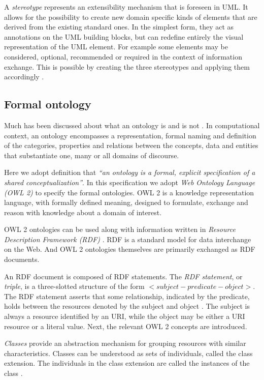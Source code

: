	A \textit{stereotype} represents an extensibility mechanism that is foreseen in UML. It allows for the possibility to create new domain specific kinds of elements that are derived from the existing standard ones. In the simplest form, they act as annotations on the UML building blocks, but can redefine entirely the visual representation of the UML element. For example some elements may be considered, optional, recommended or required in the context of information exchange. This is possible by creating the three stereotypes and applying them accordingly \cite{uml-userguide}.

	\subsection{Formal ontology}
	\label{sec:ontology}

	Much has been discussed about what an ontology is and is not \cite{guarino2009ontology}. In computational context, an ontology encompasses a representation, formal naming and definition of the categories, properties and relations between the concepts, data and entities that substantiate one, many or all domains of discourse.
	
	Here we adopt \citet{studer1998} definition that \textit{``an ontology is a formal, explicit specification of a shared conceptualization''}. In this specification we adopt \textit{Web Ontology Language (OWL 2)} \cite{owl1,owl2,owl2.0} to specify the formal ontologies. OWL 2 is a knowledge representation language, with formally defined meaning, designed to formulate, exchange and reason with knowledge about a domain of interest. 
	
	OWL 2 ontologies can be used along with information written in \textit{Resource Description Framework (RDF)} \cite{rdf11}. RDF is a standard model for data interchange on the Web. And OWL 2 ontologies themselves are primarily exchanged as RDF documents.  
	
	An RDF document is composed of RDF statements. The \textit{RDF statement}, or \textit{triple}, is a three-slotted structure of the form $<subject- predicate-object>$. The RDF statement asserts that some relationship, indicated by the predicate, holds between the resources denoted by the subject and object \cite{rdf11}. The subject is always a resource identified by an URI, while the object may be either a URI resource or a literal value. Next, the relevant OWL 2 concepts are introduced.

	\textit{Classes} provide an abstraction mechanism for grouping resources with similar characteristics. Classes can be understood as sets of individuals, called the class extension. The individuals in the class extension are called the instances of the class \cite{owl1}.

